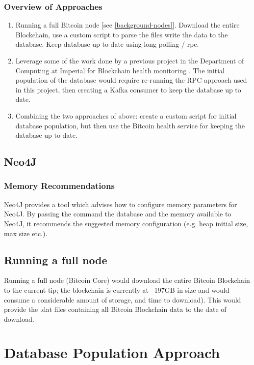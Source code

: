 \subsubsection{Overview of Approaches}
\begin{enumerate}
    \item Running a full Bitcoin node [see \ref{background-nodes}]. Download the entire Blockchain, use a custom script to parse the files write the data to the database. Keep database up to date using long polling / \gls{rpc}. 
    \item Leverage some of the work done by a previous project in the Department of Computing at Imperial for Blockchain health monitoring \cite{RefWorks:doc:5c6bd151e4b041254f892045}. The initial population of the database would require re-running the RPC approach used in this project, then creating a Kafka consumer to keep the database up to date. 
    \item Combining the two approaches of above: create a custom script for initial database population, but then use the Bitcoin health service for keeping the database up to date. 
\end{enumerate}


\subsection{Neo4J}


\subsubsection{Memory Recommendations}
Neo4J provides a tool which advises how to configure memory parameters for Neo4J. By passing the command the database and the memory available to Neo4J, it recommends the suggested memory configuration (e.g. heap initial size, max size etc.). 

\subsection{Running a full node}
Running a full node (Bitcoin Core) would download the entire Bitcoin Blockchain to the current tip; the blockchain is currently at ~197GB\cite{RefWorks:doc:5c6ab1a3e4b05e3aaec0ffc8} in size and would consume a considerable amount of storage, and time to download). This would provide the .dat files containing all Bitcoin Blockchain data to the date of download. 


\section{Database Population Approach}

